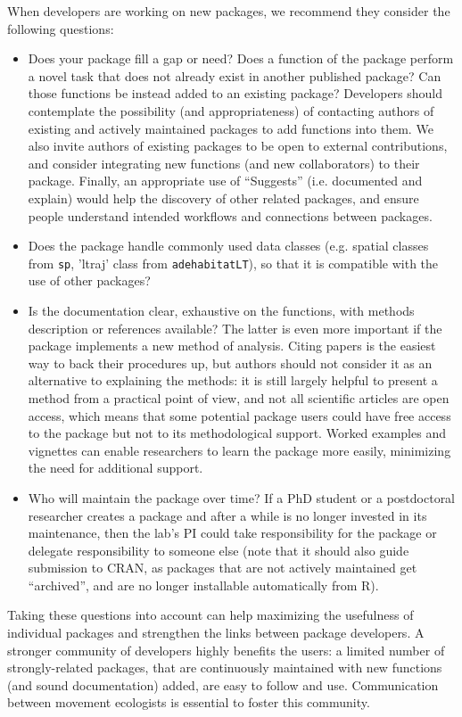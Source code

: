 \documentclass[a4paper,12pt]{article}
\newcommand{\Rpkg}[1]{\texttt{#1}}
\begin{document}
{When developers are working on new packages, we recommend they consider the following questions:
\begin{itemize}
        \item Does your package fill a gap or need? Does a function of the package perform a novel task that does not already exist in another published package? Can those functions be instead added to an existing package? Developers should contemplate the possibility (and appropriateness) of contacting authors of existing and actively maintained packages to add functions into them. We also invite authors of existing packages to be open to external contributions, and consider integrating new functions (and new collaborators) to their package. Finally, an appropriate use of ``Suggests'' (i.e. documented and explain) would help the discovery of other related packages, and ensure people understand intended workflows and connections between packages.
        \item Does the package handle commonly used data classes (e.g. spatial classes from \Rpkg{sp}, 'ltraj' class from \Rpkg{adehabitatLT}), so that it is compatible with the use of other packages? %
        \item Is the documentation clear, exhaustive on the functions, with methods description or references available? The latter is even more important if the package implements a new method of analysis. Citing papers is the easiest way to back their procedures up, but authors should not consider it as an alternative to explaining the methods: it is still largely helpful to present a method from a practical point of view, and not all scientific articles are open access, which means that some potential package users could have free access to the package but not to its methodological support. Worked %
examples and vignettes can enable researchers to learn the package more easily, minimizing the need for additional support.
        \item Who will maintain the package over time? If a PhD student or a postdoctoral researcher creates a package and after a while is no longer invested in its maintenance, then the lab's PI could take responsibility for the package or delegate responsibility to someone else (note that it should also guide submission to CRAN, as packages that are not actively maintained get ``archived'', and are no longer installable automatically from R).
\end{itemize} 

Taking these questions into account can help maximizing the usefulness of individual packages and strengthen the links between package developers. A stronger community of developers  highly benefits the users: a limited number of strongly-related packages, that are continuously maintained with new functions (and sound documentation) added, are easy to follow and use. Communication between movement ecologists is essential to foster this community. 

}
\end{document}
